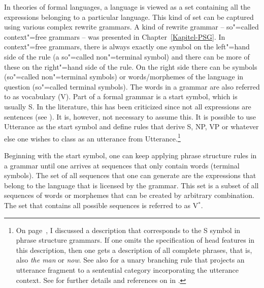 In theories of formal languages, a language is viewed as a set containing all
the expressions belonging to a particular language. This kind of set can be captured using various
complex rewrite grammars. A kind of rewrite grammar -- so"=called context"=free 
grammars -- was presented in Chapter~\ref{Kapitel-PSG}.
In context"=free grammars, there is always exactly one symbol on the left"=hand side of the rule
(a so"=called non"=terminal symbol) and there can be more of these on the right"=hand side of the
rule. On the right side there can be symbols (so"=called non"=terminal symbols) or words/morphemes
of the language in question (so"=called terminal symbols). The words in a grammar are also referred to as vocabulary (V). Part of a formal grammar is
a start symbol, which is usually S. In the literature, this has been criticized since not all expressions
are sentences (see \citealp[]{Deppermann2006a}). It is, however, not necessary to assume
this. It is possible to use Utterance as the start symbol and define rules that derive S, NP, VP or whatever else
one wishes to class as an utterance from Utterance.\footnote{%
	On page~\pageref{HPSG-Rootnode}, I discussed a description that corresponds to the
	S symbol in phrase structure grammars. If one omits the specification of head features
	in this description, then one gets a description of all complete phrases, that is,
	also \emph{the man} or \emph{now}. See also  for a unary
        branching rule that projects an utterance fragment to a sentential category incorporating
        the utterance context. See  for further details and references on  in \hpsg.
}
  
Beginning with the start symbol, one can keep applying phrase structure rules in a grammar  
until one arrives at sequences that only contain words (terminal symbols). The set of all sequences
that one can generate are the expressions that belong to the language that is licensed by the grammar.
This set is a subset of all sequences of words or morphemes that can be created by arbitrary 
combination. The set that contains all possible sequences is referred to as V$^*$.   
  
